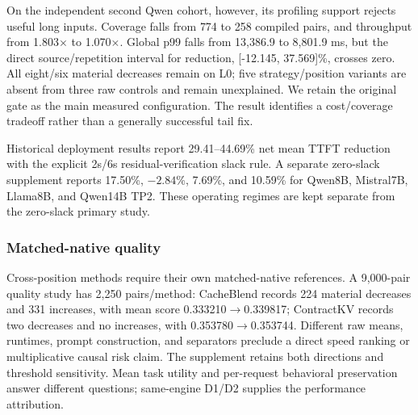 On the independent second Qwen cohort, however, its profiling support rejects useful long inputs. Coverage falls from 774 to 258 compiled pairs, and throughput from 1.803$\times$ to 1.070$\times$. Global p99 falls from 13,386.9 to 8,801.9 ms, but the direct source/repetition interval for reduction, [-12.145, 37.569]\%, crosses zero. All eight/six material decreases remain on L0; five strategy/position variants are absent from three raw controls and remain unexplained. We retain the original gate as the main measured configuration. The result identifies a cost/coverage tradeoff rather than a generally successful tail fix.

Historical deployment results report 29.41--44.69\% net mean TTFT reduction with the explicit 2s/6s residual-verification slack rule. A separate zero-slack supplement reports 17.50\%, $-2.84$\%, 7.69\%, and 10.59\% for Qwen8B, Mistral7B, Llama8B, and Qwen14B TP2. These operating regimes are kept separate from the zero-slack primary study.

\subsubsection{Matched-native quality}
\label{sec:baselines}
Cross-position methods require their own matched-native references. A 9,000-pair quality study has 2,250 pairs/method: CacheBlend records 224 material decreases and 331 increases, with mean score 0.333210$\rightarrow$0.339817; ContractKV records two decreases and no increases, with 0.353780$\rightarrow$0.353744. Different raw means, runtimes, prompt construction, and separators preclude a direct speed ranking or multiplicative causal risk claim. The supplement retains both directions and threshold sensitivity. Mean task utility and per-request behavioral preservation answer different questions; same-engine D1/D2 supplies the performance attribution.
